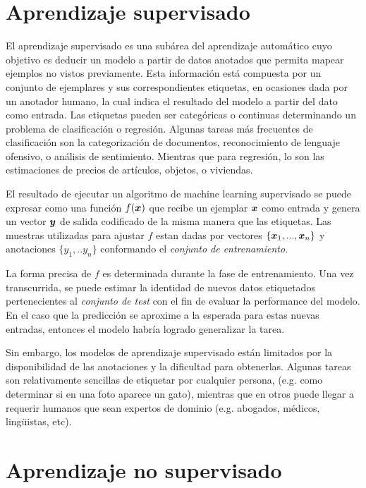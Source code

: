 \section{Aprendizaje supervisado}

El aprendizaje supervisado es una subárea del aprendizaje automático cuyo
objetivo es deducir un modelo a partir de datos anotados que permita mapear
ejemplos no vistos previamente. Esta información está compuesta por un conjunto
de ejemplares y sus correspondientes etiquetas, en ocasiones dada por un
anotador humano, la cual indica el resultado del modelo a partir del dato como
entrada. Las etiquetas pueden ser categóricas o continuas determinando un
problema de clasificación o regresión. Algunas tareas más frecuentes de
clasificación son la categorización de documentos, reconocimiento de lenguaje
ofensivo, o análisis de sentimiento. Mientras que para regresión, lo son las
estimaciones de precios de artículos, objetos, o viviendas.

El resultado de ejecutar un algoritmo de machine learning supervisado se puede
expresar como una función $f(\boldsymbol{x})$ que recibe un ejemplar $\boldsymbol{x}$ como
entrada y genera un vector $\boldsymbol{y}$ de salida codificado de la misma manera
que las etiquetas. Las muestras utilizadas para ajustar $f$ estan dadas por
vectores $\{\boldsymbol{x}_1, ..., \boldsymbol{x}_n\}$ y anotaciones $\{y_1, .. y_n\}$
conformando el \emph{conjunto de entrenamiento}.

La forma precisa de $f$ es determinada durante la fase de entrenamiento. Una vez
transcurrida, se puede estimar la identidad de nuevos datos etiquetados
pertenecientes al \emph{conjunto de test} con el fin de evaluar la performance
del modelo. En el caso que la predicción se aproxime a la esperada para estas
nuevas entradas, entonces el modelo habría logrado generalizar la tarea.

Sin embargo, los modelos de aprendizaje supervisado están limitados por la
disponibilidad de las anotaciones y la dificultad para obtenerlas.
Algunas tareas son relativamente sencillas de etiquetar por cualquier
persona, (e.g. como determinar si en una foto aparece un gato), mientras que en
otros puede llegar a requerir humanos que sean expertos de dominio (e.g.
abogados, médicos, lingüistas, etc).

\section{Aprendizaje no supervisado}

